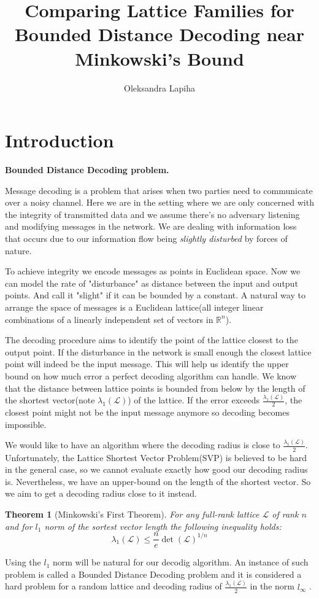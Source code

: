 \documentclass[12pt]{article}
\title{Comparing Lattice Families for Bounded Distance Decoding near Minkowski’s Bound}
\author{ Oleksandra Lapiha }
\newcommand{\LL}{\mathcal{L}}
\newtheorem{theorem}{Theorem}
\begin{document}
\maketitle



\section{Introduction}
\label{sec:intro}



\textbf{Bounded Distance Decoding problem.}

Message decoding is a problem that arises when two parties need to communicate over a noisy channel. Here we are in the setting where we are only concerned with the integrity of transmitted data and we assume there's no adversary listening and modifying messages in the network. We are dealing with information loss that occurs due to our information flow being \textit{slightly disturbed} by forces of nature.

To achieve integrity we encode messages as points in Euclidean space. Now we can model the rate of "disturbance" as distance between the input and output points. And call it "slight" if it can be bounded by a constant. A natural way to arrange the space of messages is a Euclidean lattice(all integer linear combinations of a linearly independent set of vectors in $\mathbb{R}^{n}$).

The decoding procedure aims to identify the point of the lattice closest to the output point. If the disturbance in the network is small enough the closest lattice point will indeed be the input message. This will help us identify the upper bound on how much error a perfect decoding algorithm can handle. We know that the distance between lattice points is bounded from below by the length of the shortest vector(note $\lambda_{1}(\LL)$) of the lattice. If the error exceeds $\frac{\lambda_{1}(\LL)}{2}$, the closest point might not be the input message anymore so decoding becomes impossible.

We would like to have an algorithm where the decoding radius is close to $\frac{\lambda_{1}(\LL)}{2}$. Unfortunately, the Lattice Shortest Vector Problem(SVP) is believed to be hard in the general case, so we cannot evaluate exactly how good our decoding radius is. Nevertheless, we have an upper-bound on the length of the shortest vector. So we aim to get a decoding radius close to it instead.
\begin{theorem}[Minkowski's First Theorem]
    For any full-rank lattice $\LL$ of rank $n$ and for $l_1$ norm of the sortest vector length the following inequality holds:
    \[
        \lambda_{1}(\LL) \leq \frac{n}{e} \det(\LL)^{1/n}
    \]
\end{theorem}
Using the $l_1$ norm will be natural for our decodig algorithm.
An instance of such problem is called a Bounded Distance Decoding problem and it is considered a hard problem for a random lattice and decoding radius of $\frac{\lambda_{1}(\LL)}{2}$ in the norm $l_{\infty}$ \cite{[LM09]}.
\end{document}
